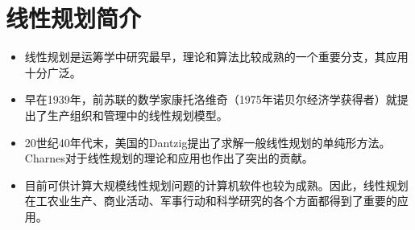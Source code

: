 \section{线性规划简介}
\begin{frame}{\secname}
\begin{itemize}
    \item 线性规划是运筹学中研究最早，理论和算法比较成熟的一个重要分支，其应用十分广泛。
    \item 早在1939年，前苏联的数学家康托洛维奇（1975年诺贝尔经济学获得者）就提出了生产组织和管理中的线性规划模型。
    \item 20世纪40年代末，美国的Dantzig提出了求解一般线性规划的单纯形方法。Charnes对于线性规划的理论和应用也作出了突出的贡献。
    \item 目前可供计算大规模线性规划问题的计算机软件也较为成熟。因此，线性规划在工农业生产、商业活动、军事行动和科学研究的各个方面都得到了重要的应用。
\end{itemize}
 \end{frame}
 
